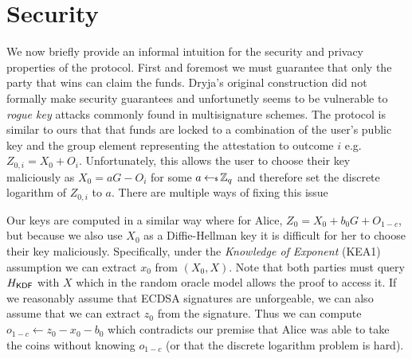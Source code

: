 \documentclass[runningheads]{llncs}
\begin{document}





\section{Security}

We now briefly provide an informal intuition for the security and privacy properties of the protocol. First and foremost we must guarantee that only the party that wins can claim the funds. Dryja's original construction did not formally make security guarantees and unfortunetly seems to be vulnerable to \emph{rogue key} attacks commonly found in multisignature schemes. The protocol is similar to ours that that funds are locked to a combination of the user's public key and the group element representing the attestation to outcome $i$ e.g. $Z_{0,i} = X_0 + O_i$. Unfortunately, this allows the user to choose their key maliciously as $X_0 = aG - O_i$ for some $a \hskip2.3pt{\gets\!\!\mbox{\tiny${\$}$\normalsize}}\, \mathbb{Z}_q$ and therefore set the discrete logarithm of $Z_{0,i}$ to $a$. There are multiple ways of fixing this issue

Our keys are computed in a similar way where for Alice, $Z_0 = X_0 + b_0G + O_{1-c}$, but because we also use $X_0$ as a Diffie-Hellman key it is difficult for her to choose their key maliciously. Specifically, under the \emph{Knowledge of Exponent} (KEA1) assumption we can extract $x_0$ from $(X_0,X)$. Note that both parties must query $H_{\textsf{KDF}}$ with $X$ which in the random oracle model allows the proof to access it. If we reasonably assume that ECDSA signatures are unforgeable, we can also assume that we can extract $z_0$ from the signature. Thus we can compute $o_{1-c} \gets z_0 - x_0 - b_0$ which contradicts our premise that Alice was able to take the coins without knowing $o_{1-c}$ (or that the discrete logarithm problem is hard).
\end{document}
